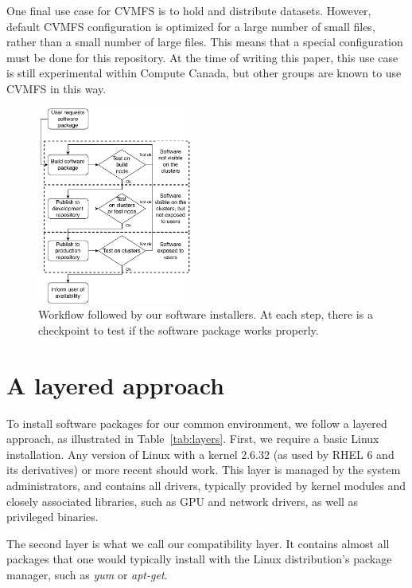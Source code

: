 \documentclass[sigconf]{acmart}
\begin{document}
One final use case for CVMFS is to hold and distribute datasets. However, default CVMFS configuration is optimized for a large number of small files, rather than a small number of large files. This means that a special configuration must be done for this repository. At the time of writing this paper, this use case is still experimental within Compute Canada, but other groups are known to use CVMFS in this way.

\begin{figure}
  \includegraphics[width=0.45\textwidth]{Software-installation-workflow.pdf}
  \caption{Workflow followed by our software installers. At each step, there is a checkpoint to test if the software package works properly.}
  \label{fig:Workflow}
\end{figure}



\section{A layered approach}
\label{sec:Layered_environment}
To install software packages for our common environment, we follow a layered approach, as illustrated in Table~\ref{tab:layers}. First, we require a basic Linux installation. Any version of Linux with a kernel 2.6.32 (as used by RHEL 6 and its derivatives) or more recent should work. This layer is managed by the system administrators, and contains all drivers, typically provided by kernel modules and closely associated libraries, such as GPU and network drivers, as well as privileged binaries. 

The second layer is what we call our compatibility layer. It contains almost all packages that one would typically install with the Linux distribution's package manager, such as {\it yum} or {\it apt-get}. 
\end{document}
